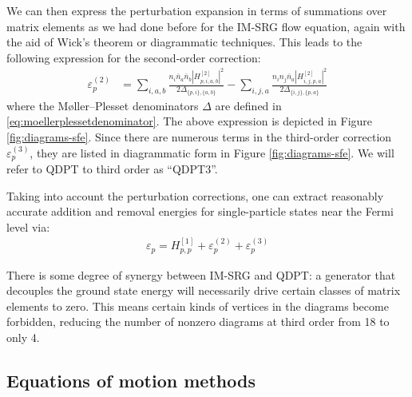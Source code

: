 We can then express the perturbation expansion in terms of summations over matrix elements as we had done before for the IM-SRG flow equation, again with the aid of Wick's theorem or diagrammatic techniques.  This leads to the following expression for the second-order correction:
\begin{align*}
  \varepsilon_p^{(2)}
  &=
    \sum_{i, a, b} \frac{n_i \bar{n}_a \bar{n}_b |H^{[2]}_{p, i, a, b}|^2}{2 \Delta_{\{p, i\}, \{a, b\}}}
    - \sum_{i, j, a} \frac{n_i n_j \bar{n}_a |H^{[2]}_{i, j, p, a}|^2}{2 \Delta_{\{i, j\}, \{p, a\}}}
\end{align*}
where the M\o ller--Plesset denominators $\Delta$ are defined in \eqref{eq:moellerplessetdenominator}.  The above expression is depicted in Figure \ref{fig:diagrams-sfe}.  Since there are numerous terms in the third-order correction $\varepsilon_p^{(3)}$, they are listed in diagrammatic form in Figure \ref{fig:diagrams-sfe}.  We will refer to QDPT to third order as ``QDPT3''.

Taking into account the perturbation corrections, one can extract reasonably accurate addition and removal energies for single-particle states near the Fermi level via:
\begin{align*}
  \varepsilon_p = H^{[1]}_{p, p} + \varepsilon_p^{(2)} + \varepsilon_p^{(3)}
\end{align*}

There is some degree of synergy between IM-SRG and QDPT: a generator that decouples the ground state energy will necessarily drive certain classes of matrix elements to zero.  This means certain kinds of vertices in the diagrams become forbidden, reducing the number of nonzero diagrams at third order from 18 to only 4.

\subsection{Equations of motion methods}

